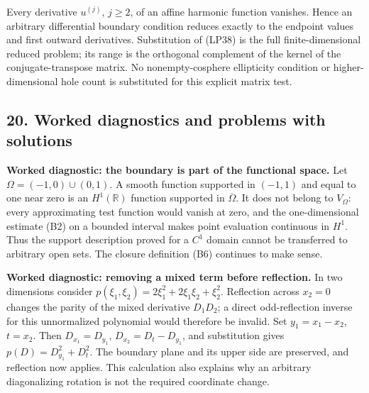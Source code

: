 \documentclass[
  11pt,
]{article}
\makeatletter
\let\ReaderOriginalAnchorStart\hyper@anchorstart
\let\ReaderOriginalAnchorEnd\hyper@anchorend
\let\ReaderPendingAliases\@empty
\def\ReaderArmAliases#1{\gdef\ReaderPendingAliases{#1}}
\def\hyper@anchorstart#1{\ReaderIfNativeAnchorTF{#1}{\ReaderPendingAliases\global\let\ReaderPendingAliases\@empty}{}\ReaderOriginalAnchorStart{#1}}
\makeatother
\begin{document}
Every derivative \(u^{(j)}\), \(j\ge2\), of an affine harmonic function
vanishes. Hence an arbitrary differential boundary condition reduces
exactly to the endpoint values and first outward derivatives.
Substitution of (LP38) is the full finite-dimensional reduced problem;
its range is the orthogonal complement of the kernel of the
conjugate-transpose matrix. No nonempty-cosphere ellipticity condition
or higher-dimensional hole count is substituted for this explicit matrix
test.

\ReaderArmAliases{\ReaderOriginalAnchorStart{AN03-SBD-090}\ReaderOriginalAnchorEnd\begingroup\expandafter\def\csname @currentHref\endcsname{AN03-SBD-090}\label{AN03-SBD-090}\endgroup\ReaderOriginalAnchorStart{an03-sbd-090-worked-diagnostics-and-problems-with-solutions}\ReaderOriginalAnchorEnd\begingroup\expandafter\def\csname @currentHref\endcsname{an03-sbd-090-worked-diagnostics-and-problems-with-solutions}\label{an03-sbd-090-worked-diagnostics-and-problems-with-solutions}\endgroup\ReaderOriginalAnchorStart{20-worked-diagnostics-and-problems-with-solutions}\ReaderOriginalAnchorEnd\begingroup\expandafter\def\csname @currentHref\endcsname{20-worked-diagnostics-and-problems-with-solutions}\label{20-worked-diagnostics-and-problems-with-solutions}\endgroup\ReaderOriginalAnchorStart{worked-diagnostics-and-problems-with-solutions}\ReaderOriginalAnchorEnd}
\subsection{20. Worked diagnostics and problems with
solutions}\label{worked-diagnostics-and-problems-with-solutions}

\textbf{Worked diagnostic: the boundary is part of the functional
space.} Let \(\Omega=(-1,0)\cup(0,1)\). A smooth function supported in
\((-1,1)\) and equal to one near zero is an \(H^1(\mathbb R)\) function
supported in \(\overline\Omega\). It does not belong to \(V_\Omega\):
every approximating test function would vanish at zero, and the
one-dimensional estimate (B2) on a bounded interval makes point
evaluation continuous in \(H^1\). Thus the support description proved
for a \(C^1\) domain cannot be transferred to arbitrary open sets. The
closure definition (B6) continues to make sense.

\textbf{Worked diagnostic: removing a mixed term before reflection.} In
two dimensions consider \(p(\xi_1,\xi_2)=2\xi_1^2+2\xi_1\xi_2+\xi_2^2\).
Reflection across \(x_2=0\) changes the parity of the mixed derivative
\(D_1D_2\); a direct odd-reflection inverse for this unnormalized
polynomial would therefore be invalid. Set \(y_1=x_1-x_2\), \(t=x_2\).
Then \(D_{x_1}=D_{y_1}\), \(D_{x_2}=D_t-D_{y_1}\), and substitution
gives \(p(D)=D_{y_1}^2+D_t^2\). The boundary plane and its upper side
are preserved, and reflection now applies. This calculation also
explains why an arbitrary diagonalizing rotation is not the required
coordinate change.
\end{document}
